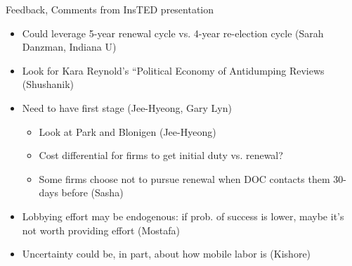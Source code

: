 \documentclass[handout]{beamer}
\begin{document}
\begin{frame}{Feedback, Comments from InsTED presentation}
\begin{itemize}[<+->]
	\item Could leverage 5-year renewal cycle vs. 4-year re-election cycle (Sarah Danzman, Indiana U)
	\item Look for Kara Reynold's ``Political Economy of Antidumping Reviews (Shushanik)
	\item Need to have first stage (Jee-Hyeong, Gary Lyn)
		\begin{itemize}
			\item Look at Park and Blonigen (Jee-Hyeong)
			\item Cost differential for firms to get initial duty vs. renewal?
			\item Some firms choose not to pursue renewal when DOC contacts them 30-days before (Sasha)
		\end{itemize}
	\item Lobbying effort may be endogenous: if prob. of success is lower, maybe it's not worth providing effort (Mostafa)
	\item Uncertainty could be, in part, about how mobile labor is (Kishore)
\end{itemize}

\end{frame}
\end{document}
